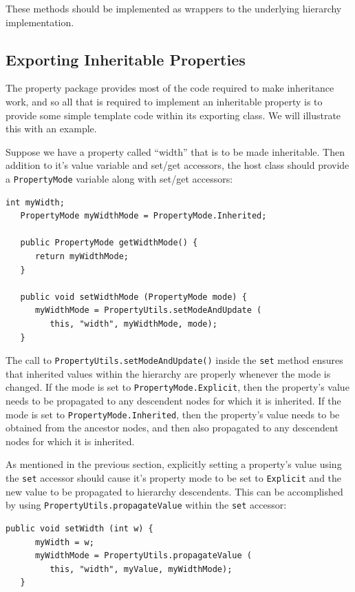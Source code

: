 \documentclass{article}
\begin{document}
These methods should be implemented as wrappers to the underlying
hierarchy implementation.

\subsection{Exporting Inheritable Properties}

The property package provides most of the code required to make
inheritance work, and so all that is required to implement an
inheritable property is to provide some simple template code within
its exporting class. We will illustrate this with an example.

Suppose we have a property called ``width'' that is to be made
inheritable.  Then addition to it's value variable and set/get
accessors, the host class should provide a {\tt PropertyMode} variable
along with set/get accessors:
\begin{lstlisting}[]
   int myWidth;
   PropertyMode myWidthMode = PropertyMode.Inherited;
   
   public PropertyMode getWidthMode() {
      return myWidthMode;
   }

   public void setWidthMode (PropertyMode mode) {
      myWidthMode = PropertyUtils.setModeAndUpdate (
         this, "width", myWidthMode, mode);
   }
\end{lstlisting}
The call to {\tt PropertyUtils.setModeAndUpdate()} inside the 
{\tt set} method ensures that inherited values within the hierarchy are
properly whenever the mode is changed. If the mode is set to 
{\tt PropertyMode.Explicit}, then the property's value needs to be
propagated to any descendent nodes for which it is inherited.  If the
mode is set to {\tt PropertyMode.Inherited}, then the property's value
needs to be obtained from the ancestor nodes, and then also propagated
to any descendent nodes for which it is inherited.

As mentioned in the previous section, explicitly setting a property's
value using the {\tt set} accessor should cause it's property mode to
be set to {\tt Explicit} and the new value to be propagated to
hierarchy descendents.  This can be accomplished by using 
{\tt PropertyUtils.propagateValue} within the {\tt set} accessor:
\begin{lstlisting}[]
   public void setWidth (int w) {
      myWidth = w;
      myWidthMode = PropertyUtils.propagateValue (
         this, "width", myValue, myWidthMode);
   }     
\end{lstlisting}
\end{document}
